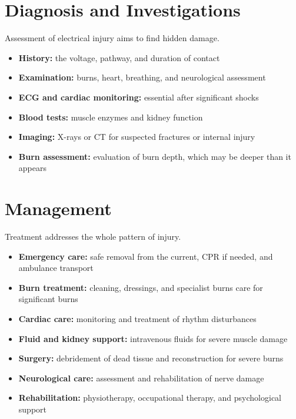 \section*{Diagnosis and Investigations}
Assessment of electrical injury aims to find hidden damage.
\begin{itemize}
    \item \textbf{History:} the voltage, pathway, and duration of contact
    \item \textbf{Examination:} burns, heart, breathing, and neurological assessment
    \item \textbf{ECG and cardiac monitoring:} essential after significant shocks
    \item \textbf{Blood tests:} muscle enzymes and kidney function
    \item \textbf{Imaging:} X-rays or CT for suspected fractures or internal injury
    \item \textbf{Burn assessment:} evaluation of burn depth, which may be deeper than it appears
\end{itemize}

\section*{Management}
Treatment addresses the whole pattern of injury.
\begin{itemize}
    \item \textbf{Emergency care:} safe removal from the current, CPR if needed, and ambulance transport
    \item \textbf{Burn treatment:} cleaning, dressings, and specialist burns care for significant burns
    \item \textbf{Cardiac care:} monitoring and treatment of rhythm disturbances
    \item \textbf{Fluid and kidney support:} intravenous fluids for severe muscle damage
    \item \textbf{Surgery:} debridement of dead tissue and reconstruction for severe burns
    \item \textbf{Neurological care:} assessment and rehabilitation of nerve damage
    \item \textbf{Rehabilitation:} physiotherapy, occupational therapy, and psychological support
\end{itemize}


